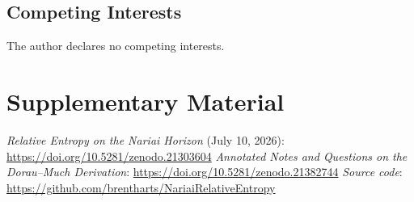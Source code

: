 \documentclass[11pt]{article}
\begin{document}
\subsection*{Competing Interests}
The author declares no competing interests.

\appendix

\section{Supplementary Material}
\noindent \emph{Relative Entropy on the Nariai Horizon} (July 10, 2026): 
\newline \url{https://doi.org/10.5281/zenodo.21303604}
\newline
\emph{Annotated Notes and Questions on the Dorau--Much Derivation}: 
\newline
\url{https://doi.org/10.5281/zenodo.21382744}
\newline
\emph{Source code}: \url{https://github.com/brentharts/NariaiRelativeEntropy}
\end{document}
